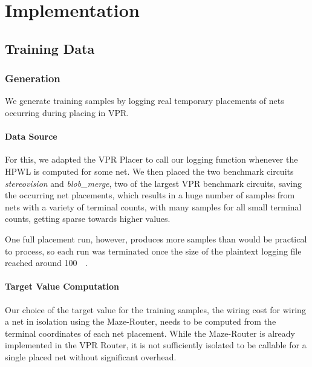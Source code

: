 
\chapter{Implementation}\label{ch:implementation}
\glsresetall %

\section{Training Data}



\subsection{Generation}

We generate training samples by logging real temporary placements of nets occurring during placing in \gls{VPR}.

\subsubsection{Data Source}

For this, we adapted the \gls{VPR} Placer to call our logging function whenever the \gls{HPWL} is computed for some net. We then placed the two benchmark circuits \textit{stereovision} and \textit{blob\_merge}, two of the largest \gls{VPR} benchmark circuits, saving the occurring net placements, which results in a huge number of samples from nets with a variety of terminal counts, with many samples for all small terminal counts, getting sparse towards higher values.

One full placement run, however, produces more samples than would be practical to process, so each run was terminated once the size of the plaintext logging file reached around \SI{100}{\mega\byte}.

\subsubsection{Target Value Computation}

Our choice of the target value for the training samples, the wiring cost for wiring a net in isolation using the Maze-Router, needs to be computed from the terminal coordinates of each net placement. While the Maze-Router is already implemented in the \gls{VPR} Router, it is not sufficiently isolated to be callable for a single placed net without significant overhead.

